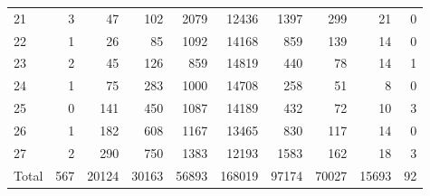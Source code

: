 \begin{table}
\begin{tabular}{lrrrrrrrrr}
21 & 3 & 47 & 102 & 2079 & 12436 & 1397 & 299 & 21 & 0 \\
22 & 1 & 26 & 85 & 1092 & 14168 & 859 & 139 & 14 & 0 \\
23 & 2 & 45 & 126 & 859 & 14819 & 440 & 78 & 14 & 1 \\
24 & 1 & 75 & 283 & 1000 & 14708 & 258 & 51 & 8 & 0 \\
25 & 0 & 141 & 450 & 1087 & 14189 & 432 & 72 & 10 & 3 \\
26 & 1 & 182 & 608 & 1167 & 13465 & 830 & 117 & 14 & 0 \\
27 & 2 & 290 & 750 & 1383 & 12193 & 1583 & 162 & 18 & 3 \\
Total & 567 & 20124 & 30163 & 56893 & 168019 & 97174 & 70027 & 15693 & 92 \\
\end{tabular}
\end{table}
